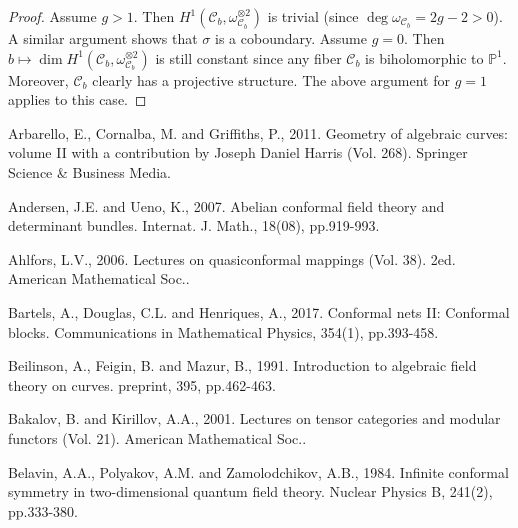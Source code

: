 \documentclass[12pt,a4paper,notitlepage]{article}
\theoremstyle{definition}
\theoremstyle{plain}
\newcommand{\mc}{\mathcal}
\newcommand{\Pbb}{\mathbb P}
\numberwithin{equation}{section}
\begin{document}
\begin{proof}
Assume $g>1$. Then $H^1(\mc C_b,\omega_{\mc C_b}^{\otimes 2})$ is trivial (since $\deg\omega_{\mc C_b}=2g-2>0$). A similar argument  shows that $\sigma$ is a coboundary. Assume $g=0$. Then $b\mapsto \dim H^1(\mc C_b,\omega_{\mc C_b}^{\otimes 2})$ is still constant since any fiber $\mc C_b$ is biholomorphic to $\Pbb^1$. Moreover, $\mc C_b$ clearly has a projective structure.  The above argument for $g=1$ applies to this case. 
\end{proof}












	\printindex
	
	\newpage
	
	\begin{thebibliography}{999999}
		\footnotesize	
		
		
		
		
		
		Arbarello, E., Cornalba, M. and Griffiths, P., 2011. Geometry of algebraic curves: volume II with a contribution by Joseph Daniel Harris (Vol. 268). Springer Science \& Business Media.
		
Andersen, J.E. and Ueno, K., 2007. Abelian conformal field theory and determinant bundles. Internat. J.  Math., 18(08), pp.919-993.



Ahlfors, L.V., 2006. Lectures on quasiconformal mappings (Vol. 38). 2ed. American Mathematical Soc..


Bartels, A., Douglas, C.L. and Henriques, A., 2017. Conformal nets II: Conformal blocks. Communications in Mathematical Physics, 354(1), pp.393-458.

Beilinson, A., Feigin, B. and Mazur, B., 1991. Introduction to algebraic field theory on curves. preprint, 395, pp.462-463.

Bakalov, B. and Kirillov, A.A., 2001. Lectures on tensor categories and modular functors (Vol. 21). American Mathematical Soc..


Belavin, A.A., Polyakov, A.M. and Zamolodchikov, A.B., 1984. Infinite conformal symmetry in two-dimensional quantum field theory. Nuclear Physics B, 241(2), pp.333-380.
		

\end{thebibliography}
\end{document}
